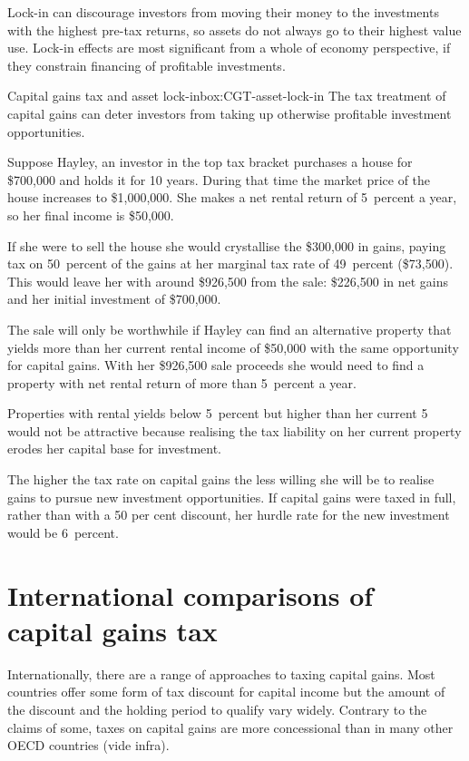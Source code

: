 \documentclass{grattan}\usepackage[]{graphicx}\usepackage[]{color}
\begin{document}
Lock-in can discourage investors from moving their money to the investments with the highest pre-tax returns, so assets do not always go to their highest value use.  Lock-in effects are most significant from a whole of economy perspective, if they constrain financing of profitable investments.  

\begin{smallbox}[!htbp]{Capital gains tax and asset lock-in}{box:CGT-asset-lock-in}
The tax treatment of capital gains can deter investors from taking up otherwise profitable investment opportunities. 



Suppose Hayley, an investor in the top tax bracket purchases a house for \$700,000 and holds it for 10 years. During that time the market price of the house increases to \$1,000,000. She makes a net rental return of 5~percent a year, so her  final income is \$50,000. 

If she were to sell the house she would crystallise the \$300,000 in gains, paying tax on 50~percent of the gains at her marginal tax rate of 49~percent (\$73,500). This would leave her with around \$926,500 from the sale: \$226,500 in net gains and her initial investment of \$700,000. 

The sale will only be worthwhile if Hayley can find an alternative property that yields more than her current rental income of \$50,000  with the same opportunity for capital gains. With her \$926,500 sale proceeds she would need to find a property with net rental return of more than 5~percent a year. 

Properties with rental yields below 5~percent but higher than her current 5 would not be attractive because realising the tax liability on her current property erodes her capital base for investment.  

The higher the tax rate on capital gains the less willing she will be to realise gains to pursue new investment opportunities. If capital gains were taxed in full, rather than with a 50 per cent discount, her hurdle rate for the new investment would be 6~percent.
\end{smallbox}

\onecolumn
\chapter{International comparisons of capital gains tax}
Internationally, there are a range of approaches to taxing capital gains. Most countries offer some form of tax discount for capital income but the amount of the discount and the holding period to qualify vary widely. Contrary to the claims of some, taxes on capital gains are more concessional than in many other OECD countries (vide infra).
\end{document}
